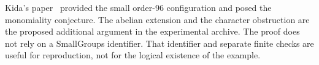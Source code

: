 Kida's paper~\cite{kida} provided the small order-96 configuration
and posed the monomiality conjecture. The abelian extension and
the character obstruction are the proposed additional argument
in the experimental archive. The proof does not rely on a
SmallGroups identifier. That identifier and separate finite
checks are useful for reproduction, not for the logical
existence of the example.


